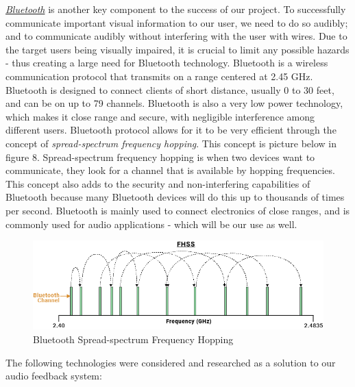 \noindent \underline{\textit{Bluetooth}} \cite{bluetooth} is another key component to the success of our project. To successfully communicate important visual information to our user, we need to do so audibly; and to communicate audibly without interfering with the user with wires. Due to the target users being visually impaired, it is crucial to limit any possible hazards - thus creating a large need for Bluetooth technology. Bluetooth is a wireless communication protocol that transmits on a range centered at 2.45 GHz. Bluetooth is designed to connect clients of short distance, usually 0 to 30 feet, and can be on up to 79 channels. Bluetooth \cite{bluetoothHow} is also a very low power technology, which makes it close range and secure, with negligible interference among different users. Bluetooth protocol allows for it to be very efficient through the concept of \textit{spread-spectrum frequency hopping}. This concept is picture below in figure 8. Spread-spectrum frequency hopping is when two devices want to communicate, they look for a channel that is available by hopping frequencies. This concept also adds to the security and non-interfering capabilities of Bluetooth because many Bluetooth devices will do this up to thousands of times per second. Bluetooth is mainly used to connect electronics of close ranges, and is commonly used for audio applications - which will be our use as well. \\

\begin{figure}[H]
	\centering
	\includegraphics[width=1\textwidth]{./Images/bluetooth-freq-hop.png}
	\caption{\label{fig:bluetooth-freq-hop}Bluetooth Spread-spectrum Frequency Hopping}
\end{figure}

\noindent The following technologies were considered and researched as a solution to our audio feedback system: \\

